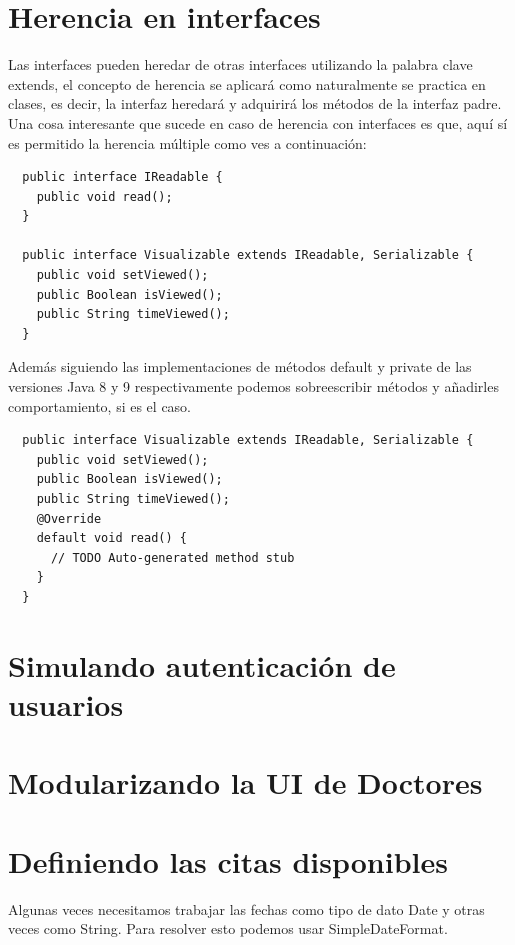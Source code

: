 \documentclass{article}
\begin{document}
\section{Herencia en interfaces}%
Las interfaces pueden heredar de otras interfaces utilizando la palabra clave
extends, el concepto de herencia se aplicará como naturalmente se practica en
clases, es decir, la interfaz heredará y adquirirá los métodos de la interfaz
padre.\\

Una cosa interesante que sucede en caso de herencia con interfaces es que, aquí
sí es permitido la herencia múltiple como ves a continuación:\\

\begin{verbatim}
  public interface IReadable {
    public void read();
  }

  public interface Visualizable extends IReadable, Serializable {
    public void setViewed();
    public Boolean isViewed();
    public String timeViewed();
  }
\end{verbatim}

Además siguiendo las implementaciones de métodos default y private de las
versiones Java 8 y 9 respectivamente podemos sobreescribir métodos y añadirles
comportamiento, si es el caso.\\

\begin{verbatim}
  public interface Visualizable extends IReadable, Serializable {
    public void setViewed();
    public Boolean isViewed();
    public String timeViewed();
    @Override
    default void read() {
      // TODO Auto-generated method stub
    }
  }
\end{verbatim}


\section{Simulando autenticación de usuarios}%


\section{Modularizando la UI de Doctores}%


\section{Definiendo las citas disponibles}%
Algunas veces necesitamos trabajar las fechas como tipo de dato Date y otras
veces como String. Para resolver esto podemos usar SimpleDateFormat.\\
\end{document}
